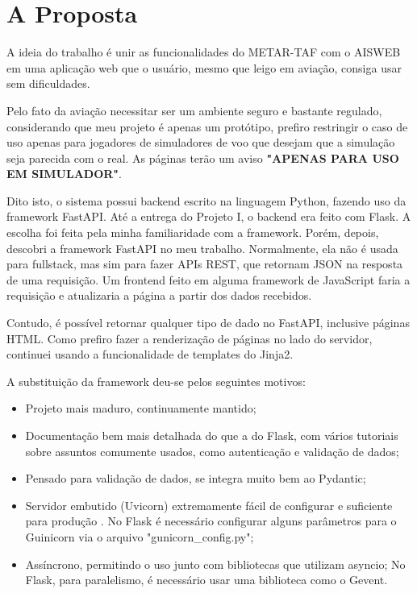 \chapter{A Proposta}
A ideia do trabalho é unir as funcionalidades do METAR-TAF com o AISWEB em uma 
aplicação web que o usuário, mesmo que leigo em aviação, consiga usar sem 
dificuldades.

Pelo fato da aviação necessitar ser um ambiente seguro e bastante regulado, considerando
que meu projeto é apenas um protótipo, prefiro restringir o caso de uso apenas
para jogadores de simuladores de voo que desejam que a simulação seja parecida
com o real. As páginas terão um aviso \textbf{"APENAS PARA USO EM SIMULADOR"}.

Dito isto, o sistema possui backend escrito na linguagem Python, fazendo uso da 
framework FastAPI. Até a entrega do Projeto I, o backend era feito com Flask. 
A escolha foi feita pela minha familiaridade com a framework. Porém, depois, 
descobri a framework FastAPI no meu trabalho. Normalmente, ela não é usada para 
fullstack, mas sim para fazer APIs REST, que retornam JSON na resposta de uma 
requisição. Um frontend feito em alguma framework de JavaScript faria a requisição
 e atualizaria a página a partir dos dados recebidos.

Contudo, é possível retornar qualquer tipo de dado no FastAPI, inclusive páginas 
HTML. Como prefiro fazer a renderização de páginas no lado do servidor, continuei
usando a funcionalidade de templates do Jinja2.

A substituição da framework deu-se pelos seguintes motivos:

\begin{itemize}
\item Projeto mais maduro, continuamente mantido;
\item Documentação bem mais detalhada do que a do Flask, com vários tutoriais sobre assuntos comumente usados, como autenticação e validação de dados;
\item Pensado para validação de dados, se integra muito bem ao Pydantic;
\item Servidor embutido (Uvicorn) extremamente fácil de configurar e suficiente para produção \cite{fast-api-prod}.
No Flask é necessário configurar alguns parâmetros para o Guinicorn via o arquivo "gunicorn\_config.py";
\item Assíncrono, permitindo o uso junto com bibliotecas que utilizam asyncio;
No Flask, para paralelismo, é necessário usar uma biblioteca como o Gevent.
\end{itemize}

